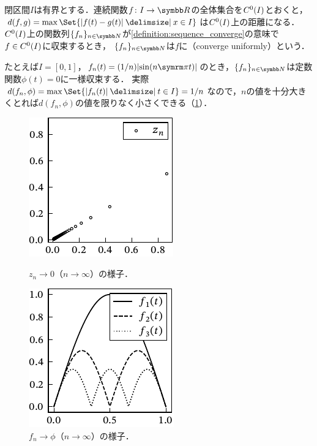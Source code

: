 \documentclass[../../main]{subfiles}
\begin{document}
\begin{example}[一様収束]
  \label{example:uniform_converge}
  閉区間\(I\)は有界とする．連続関数\(f\colon I\to\numset{R}\)の全体集合を\(C^0(I)\)とおくと，\(d(f,g)=\max\Set{\abs{f(t)-g(t)}\given x\in I}\)は\(C^0(I)\)上の距離になる．
  \(C^0(I)\)上の関数列\(\seq{f_n}_{n\in\numset{N}}\)が\cref{definition:sequence_converge}の意味で\(f\in C^0(I)\)に収束するとき，
  \(\seq{f_n}_{n\in\numset{N}}\)は\(f\)に（converge uniformly）という．

  たとえば\(I=[0,1]\)，\(f_n(t)=(1/n)\abs{\sin(n\krez t)}\)のとき，\(\seq{f_n}_{n\in\numset{N}}\)は定数関数\(\phi(t)=0\)に一様収束する．
  実際\(d(f_n,\phi)=\max\Set{\abs{f_n(t)}\given t\in I}=1/n\)なので，\(n\)の値を十分大きくとれば\(d(f_n,\phi)\)の値を限りなく小さくできる（\cref{figure:uniform_converge}）．
\end{example}

\begin{figure}[htbp]
  \begin{minipage}{0.5\linewidth}
    \centering
    \includegraphics{figures/complex_convergence.pdf}
    \caption{\(z_n\to 0\)（\(n\to\infty\)）の様子．}
    \label{figure:sequence_converge}
  \end{minipage}%
  \begin{minipage}{0.5\linewidth}
    \centering
    \includegraphics{figures/func_convergence.pdf}
    \caption{\(f_n\to\phi\)（\(n\to\infty\)）の様子．}
    \label{figure:uniform_converge}
  \end{minipage}
\end{figure}
\end{document}
